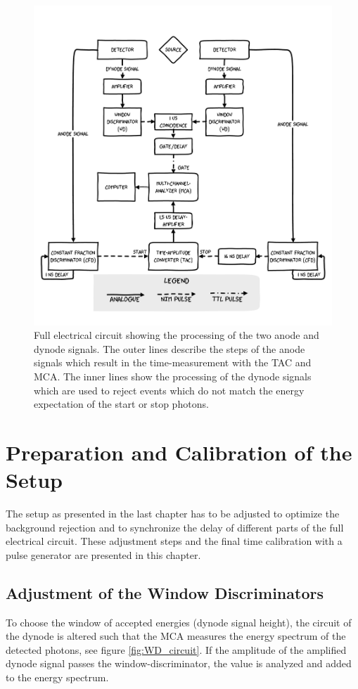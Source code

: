 \documentclass[
	paper=A4,
	parskip=full,
	chapterprefix=true,
	11pt,
	headings=normal,
	bibliography=totoc,
	listof=totoc,
	titlepage=on,
]{scrreprt}
\begin{document}
\begin{figure}
	\centering
	\includegraphics{aufbau}
	\caption{Full electrical circuit showing the processing of the two anode and dynode signals. The outer lines describe the steps of the anode signals which result in the time-measurement with the TAC and MCA. The inner lines show the processing of the dynode signals which are used to reject events which do not match the energy expectation of the start or stop photons.}
	\label{fig:full_circuit}
\end{figure}


\chapter{Preparation and Calibration of the Setup}
\label{ch:PrepandCal}
The setup as presented in the last chapter has to be adjusted to optimize the background rejection and to synchronize the delay of different parts of the full electrical circuit. These adjustment steps and the final time calibration with a pulse generator are presented in this chapter.
\section{Adjustment of the Window Discriminators}
\label{ch_WD}
To choose the window of accepted energies (dynode signal height), the circuit of the dynode is altered such that the MCA measures the energy spectrum of the detected photons, see figure \ref{fig:WD_circuit}. If the amplitude of the amplified dynode signal passes the window-discriminator, the value is analyzed and added to the energy spectrum. 
 
\end{document}
